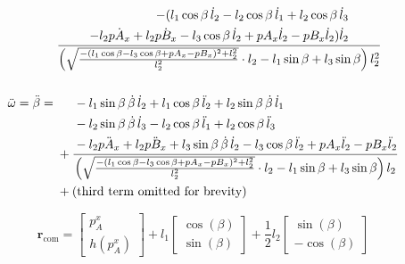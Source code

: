 \documentclass[10pt]{article}
\begin{document}
\[\ddot{\omega}  = \ddot{\beta} =
\begin{aligned}
&\frac{
\begin{aligned}
-(l_1 \cos\beta \, \dot{l}_2 - l_2 \cos\beta \, \dot{l}_1 + l_2 \cos\beta \, \dot{l}_3 \\
- l_2 \dot{pA_x} + l_2 \dot{pB_x} - l_3 \cos\beta \, \dot{l}_2 + pA_x \dot{l}_2 - pB_x \dot{l}_2) \dot{l}_2
\end{aligned}
}
{\left(\sqrt{\frac{-(l_1 \cos\beta - l_3 \cos\beta + pA_x - pB_x)^2 + l_2^2}{l_2^2}} \cdot l_2 - l_1 \sin\beta + l_3 \sin\beta\right) l_2^2} \\
\\
&+ 
\vspace{10pt}
\frac{
\begin{aligned}
&-l_1 \sin\beta \, \dot{\beta} \, \dot{l}_2 + l_1 \cos\beta \, \ddot{l}_2 + l_2 \sin\beta \, \dot{\beta} \, \dot{l}_1\\
&- l_2 \sin\beta \, \dot{\beta} \, \dot{l}_3 - l_2 \cos\beta \, \ddot{l}_1 + l_2 \cos\beta \, \ddot{l}_3\\
&- l_2 \ddot{pA_x} + l_2 \ddot{pB_x} + l_3 \sin\beta \, \dot{\beta} \, \dot{l}_2 - l_3 \cos\beta \, \ddot{l}_2
+ pA_x \ddot{l}_2 - pB_x \ddot{l}_2
\end{aligned}
}{
\left(\sqrt{\frac{-(l_1 \cos\beta - l_3 \cos\beta + pA_x - pB_x)^2 + l_2^2}{l_2^2}} \cdot l_2 - l_1 \sin\beta + l_3 \sin\beta\right) l_2
} \\
&+ \text{(third term omitted for brevity)}
\end{aligned}
\]

\vspace{1em}

\[
\mathbf{r}_{\mathrm{com}} =
\begin{bmatrix}
p_A^x \\
h(p_A^x)
\end{bmatrix}
+
l_1
\begin{bmatrix}
\cos(\beta) \\
\sin(\beta)
\end{bmatrix}
+
\frac{1}{2} l_2
\begin{bmatrix}
\sin(\beta) \\
-\cos(\beta)
\end{bmatrix}
\]
\end{document}
